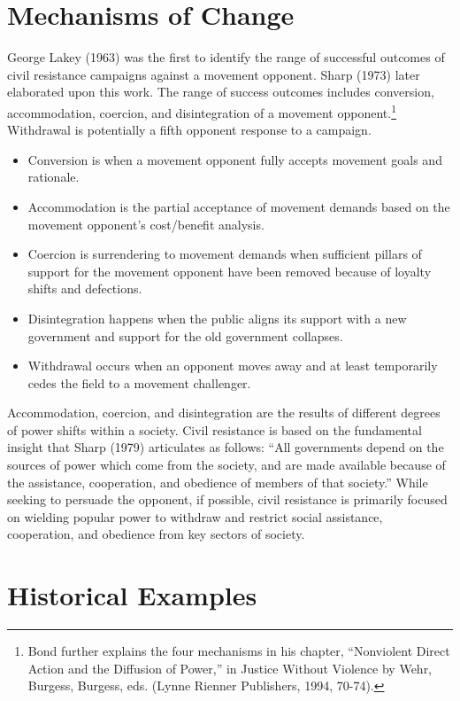 \documentclass[twoside,a4paper,12pt,fleqn,openany]{extbook}
\begin{document}
\section*{Mechanisms of Change}

George Lakey (1963) was the first to identify the range of successful outcomes of civil resistance campaigns against a movement opponent. Sharp (1973) later elaborated upon this work. The range of success outcomes includes conversion, accommodation, coercion, and disintegration of a movement opponent.\footnote{Bond further explains the four mechanisms in his chapter, “Nonviolent Direct Action and the Diffusion of Power,” in Justice Without Violence by Wehr, Burgess, Burgess, eds. (Lynne Rienner Publishers, 1994, 70-74).} Withdrawal is potentially a fifth opponent response to a campaign.

\begin{itemize}
\item Conversion is when a movement opponent fully accepts movement goals and rationale.
\item Accommodation is the partial acceptance of movement demands based on the movement opponent’s cost/benefit analysis.
\item Coercion is surrendering to movement demands when sufficient pillars of support for the movement opponent have been removed because of loyalty shifts and defections.
\item Disintegration happens when the public aligns its support with a new government and support for the old government collapses.
\item Withdrawal occurs when an opponent moves away and at least temporarily cedes the field to a movement challenger.
\end{itemize}

Accommodation, coercion, and disintegration are the results of different degrees of power shifts within a society. Civil resistance is based on the fundamental insight that Sharp (1979) articulates as follows: “All governments depend on the sources of power which come from the society, and are made available because of the assistance, cooperation, and obedience of members of that society.” While seeking to persuade the opponent, if possible, civil resistance is primarily focused on wielding popular power to withdraw and restrict social assistance, cooperation, and obedience from key sectors of society.

\section*{Historical Examples}
\end{document}
